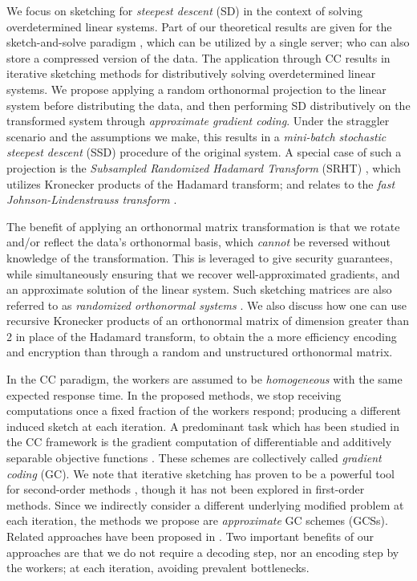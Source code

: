 \documentclass[journal,letterpaper,onecolumn,twoside,nofonttune]{IEEEtran}
\begin{document}
We focus on sketching for \textit{steepest descent} (SD) in the context of solving overdetermined linear systems. Part of our theoretical results are given for the sketch-and-solve paradigm \cite{Sar06}, which can be utilized by a single server; who can also store a compressed version of the data. The application through CC results in iterative sketching methods for distributively solving overdetermined linear systems. We propose applying a random orthonormal projection to the linear system before distributing the data, and then performing SD distributively on the transformed system through \textit{approximate gradient coding}. Under the straggler scenario and the assumptions we make, this results in a \textit{mini-batch stochastic steepest descent} (SSD) procedure of the original system. A special case of such a projection is the \textit{Subsampled Randomized Hadamard Transform} (SRHT) \cite{DMMS11,Tro11,BG13}, which utilizes Kronecker products of the Hadamard transform; and relates to the \textit{fast Johnson-Lindenstrauss transform} \cite{AC06,JL84}.

The benefit of applying an orthonormal matrix transformation is that we rotate and/or reflect the data's orthonormal basis, which \textit{cannot} be reversed without knowledge of the transformation. This is leveraged to give security guarantees,  while simultaneously ensuring that we recover well-approximated gradients, and an approximate solution of the linear system. Such sketching matrices are also referred to as \textit{randomized orthonormal systems} \cite{BP23}. We also discuss how one can use recursive Kronecker products of an orthonormal matrix of dimension greater than 2 in place of the Hadamard transform, to obtain the a more efficiency encoding and encryption than through a random and unstructured orthonormal matrix.

In the CC paradigm, the workers are assumed to be \textit{homogeneous} with the same expected response time. In the proposed methods, we stop receiving computations once a fixed fraction of the workers respond; producing a different induced sketch at each iteration. A predominant task which has been studied in the CC framework is the gradient computation of differentiable and additively separable objective functions \cite{TLDK17,HASH17,OGU19,CMH20,YA18,CT22,RTTD17,CP18,CPE17,WCP19,BWE19,WLS19,KKR19,HYKM19,CHZP18,CPH20a}. These schemes are collectively called \textit{gradient coding} (GC). We note that iterative sketching has proven to be a powerful tool for second-order methods \cite{PW16,LLDP20}, though it has not been explored in first-order methods. Since we indirectly consider a different underlying modified problem at each iteration, the methods we propose are \textit{approximate} GC schemes (GCSs). Related approaches have been proposed in \cite{CP18,RTTD17,CPE17,WCP19,BWE19,WLS19,KKR19,HYKM19,CHZP18,CPH20a}. Two important benefits of our approaches are that we do not require a decoding step, nor an encoding step by the workers; at each iteration, avoiding prevalent bottlenecks.
\end{document}
